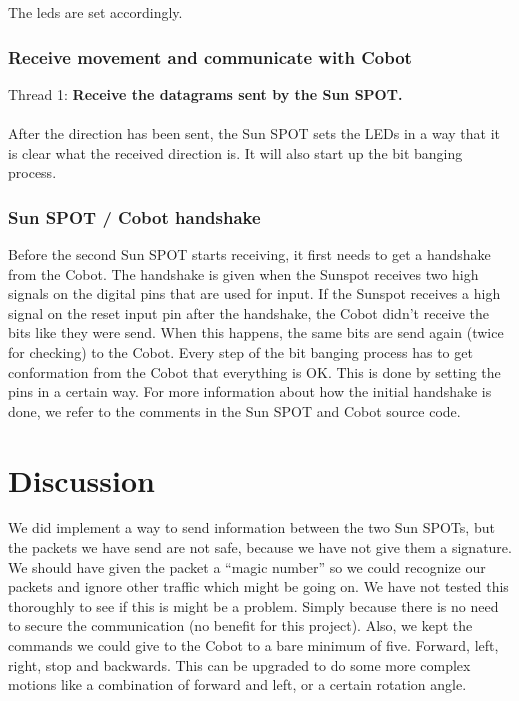 \documentclass[a4paper,10pt]{article} %
\begin{document}


\noindent The leds are set accordingly.

\subsubsection{Receive movement and communicate with Cobot} %

\noindent Thread 1: \textbf{Receive the datagrams sent by the Sun SPOT.}
\\
\\
After the direction has been sent, the Sun SPOT sets the LEDs in a way that
it is clear what the received direction is. It will also start up the bit
banging process.


\subsubsection{Sun SPOT / Cobot handshake} %
\label{ssub:Sun SPOT / Cobot handshake}

Before the second Sun SPOT starts receiving, it first needs to get a handshake
from the Cobot. The handshake is given when the Sunspot receives two high
signals on the digital pins that are used for input. If the Sunspot receives a
high signal on the reset input pin after the handshake, the Cobot didn't receive
the bits like they were send. When this happens, the same bits are send again
(twice for checking) to the Cobot. Every step of the bit banging process has to
get conformation from the Cobot that everything is OK. This is done by setting
the pins in a certain way. For more information about how the initial handshake
is done, we refer to the comments in the Sun SPOT and Cobot source code.



\section{Discussion} %

We did implement a way to send information between the two Sun SPOTs, but the
packets we have send are not safe, because we have not give them a signature.
We should have given the packet a ``magic number'' so we could recognize our
packets and ignore other traffic which might be going on. We have not tested
this thoroughly to see if this is might be a problem. Simply because there is no
need to secure the communication (no benefit for this project). Also, we kept
the commands we could give to the Cobot to a bare minimum of five. Forward,
left, right, stop and backwards. This can be upgraded to do some more complex
motions like a combination of forward and left, or a certain rotation angle.
\end{document}
